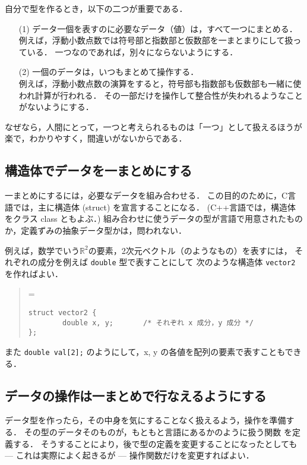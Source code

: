 \documentclass[11pt,a4,epsf]{jarticle}
\def\linesparpage#1{\baselineskip=\textheight\divide\baselineskip#1}
\begin{document}
自分で型を作るとき，以下の二つが重要である．
\begin{enumerate}

 \item[(1)] データ一個を表すのに必要なデータ（値）は，すべて一つにまとめる．	\\
例えば，浮動小数点数では符号部と指数部と仮数部を一まとまりにして扱っている．
一つなのであれば，別々にならないようにする．

 \item[(2)] 一個のデータは，いつもまとめて操作する．	\\
例えば，浮動小数点数の演算をすると，符号部も指数部も仮数部も一緒に使われ計算が行われる．
その一部だけを操作して整合性が失われるようなことがないようにする．

\end{enumerate}
なぜなら，人間にとって，一つと考えられるものは「一つ」として扱えるほうが楽で，わかりやすく，間違いがないからである．

\subsection{構造体でデータを一まとめにする}

一まとめにするには，必要なデータを組み合わせる．
この目的のために，C言語では，主に構造体 (struct) を宣言することになる．
(C++言語では，構造体をクラス class ともよぶ．)
組み合わせに使うデータの型が言語で用意されたものか，定義ずみの抽象データ型かは，問われない．

例えば，数学でいう$\mathbb{R}^2$の要素，2次元ベクトル（のようなもの）を表すには，
それぞれの成分を例えば \verb+double+ 型で表すことにして
次のような構造体 \verb+vector2+ を作ればよい．
\begin{quote}
\linesparpage{50}
\begin{verbatim}
struct vector2 {
        double x, y;       /* それぞれ x 成分，y 成分 */
};
\end{verbatim}
\end{quote}
また \verb!double val[2];! のようにして，x, y の各値を配列の要素で表すこともできる．


\subsection{データの操作は一まとめで行なえるようにする}

データ型を作ったら，その中身を気にすることなく扱えるよう，操作を準備する．
その型のデータそのものが，もともと言語にあるかのように扱う関数
を定義する．
そうすることにより，後で型の定義を変更することになったとしても --- これは実際によく起きるが --- 操作関数だけを変更すればよい．
\end{document}
